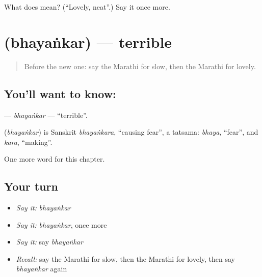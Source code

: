 \begin{tcolorbox}[breakable,colback=teal!4,colframe=teal!35!black,title={Before you move on}]
What does  mean? (\textquotedblleft{}Lovely, neat\textquotedblright{}.) Say it once more.
\end{tcolorbox}
\section[\texorpdfstring{\mr{भयंकर} (bhayaṅkar)}{भयंकर (bhayaṅkar)}]{ (bhayaṅkar) — terrible}

\label{lesson:MR-C235-bhayankar}



\begin{quote}
Before the new one: say the Marathi for slow, then the Marathi for lovely.
\end{quote}

\subsection*{You'll want to know: }
\textbf{} — \emph{bhayaṅkar} — \textquotedblleft{}terrible\textquotedblright{}.

\begin{cousinweb}
\textbf{} (\emph{bhayaṅkar}) is Sanskrit \emph{bhayaṅkara}, \textquotedblleft{}causing fear\textquotedblright{}, a tatsama: \emph{bhaya}, \textquotedblleft{}fear\textquotedblright{}, and \emph{kara}, \textquotedblleft{}making\textquotedblright{}.
\end{cousinweb}

\begin{grammarlens}[title={What you've built}]
One more word for this chapter.
\end{grammarlens}

\subsection*{Your turn}
\begin{itemize}
\raggedright
  \item \emph{Say it:} \emph{bhayaṅkar}
  \item \emph{Say it:} \emph{bhayaṅkar}, once more
  \item \emph{Say it:} say \emph{bhayaṅkar}
  \item \emph{Recall:} say the Marathi for slow, then the Marathi for lovely, then say \emph{bhayaṅkar} again
\end{itemize}

